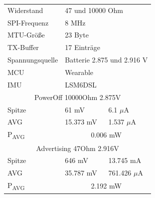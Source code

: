 \begin{figure}[!hbtp]
\begin{minipage}{0.5\textwidth}
\begin{tabular}{|l|l|l|}
      \hline
    \end{tabular}
    \label{tab:test5}
  \end{minipage}
  \begin{minipage}{0.5\textwidth}
    \centering
    \begin{tabular}{|l|l|l|}
      \hline
      Widerstand & \multicolumn{2}{l|}{47 und 10000 Ohm}\\
      SPI-Frequenz & \multicolumn{2}{l|}{8 MHz}\\
      MTU-Größe & \multicolumn{2}{l|}{23 Byte}\\
      TX-Buffer & \multicolumn{2}{l|}{17 Einträge}\\
      Spannungsquelle & \multicolumn{2}{l|}{Batterie 2.875 und 2.916 V}\\
      MCU & \multicolumn{2}{l|}{Wearable}\\
      IMU & \multicolumn{2}{l|}{LSM6DSL}\\
      \hline
      \multicolumn{3}{|c|}{PowerOff 10000Ohm 2.875V}\\
      Spitze & 61 mV & 6.1 $\mu$A\\
      AVG & 15.373 mV & 1.537 $\mu$A\\
      P\textsubscript{AVG} & \multicolumn{2}{c|}{0.006 mW}\\
      \hline
      \multicolumn{3}{|c|}{Advertising 47Ohm 2.916V}\\
      Spitze & 646 mV & 13.745 mA\\
      AVG & 35.787 mV & 761.426 $\mu$A\\
      P\textsubscript{AVG} & \multicolumn{2}{c|}{2.192 mW}\\
      \hline
    \end{tabular}
    \label{tab:test6}
  \end{minipage}
\end{figure}

